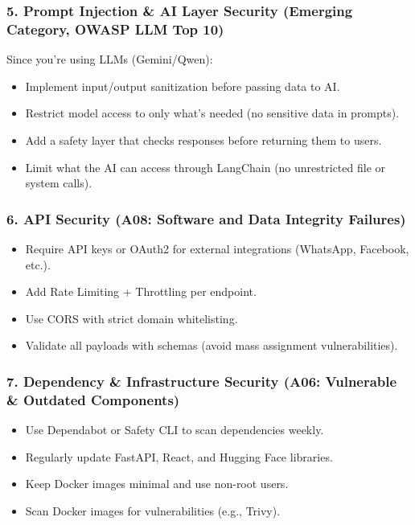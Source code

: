 \documentclass[12pt,a4paper]{article}
\begin{document}
\subsubsection{5. Prompt Injection \& AI Layer Security (Emerging Category, OWASP LLM Top 10)}
Since you’re using LLMs (Gemini/Qwen):
\begin{itemize}
    \item Implement input/output sanitization before passing data to AI.
    \item Restrict model access to only what’s needed (no sensitive data in prompts).
    \item Add a safety layer that checks responses before returning them to users.
    \item Limit what the AI can access through LangChain (no unrestricted file or system calls).
\end{itemize}

\subsubsection{6. API Security (A08: Software and Data Integrity Failures)}
\begin{itemize}
    \item Require API keys or OAuth2 for external integrations (WhatsApp, Facebook, etc.).
    \item Add Rate Limiting + Throttling per endpoint.
    \item Use CORS with strict domain whitelisting.
    \item Validate all payloads with schemas (avoid mass assignment vulnerabilities).
\end{itemize}

\subsubsection{7. Dependency \& Infrastructure Security (A06: Vulnerable \& Outdated Components)}
\begin{itemize}
    \item Use Dependabot or Safety CLI to scan dependencies weekly.
    \item Regularly update FastAPI, React, and Hugging Face libraries.
    \item Keep Docker images minimal and use non-root users.
    \item Scan Docker images for vulnerabilities (e.g., Trivy).
\end{itemize}
\end{document}
